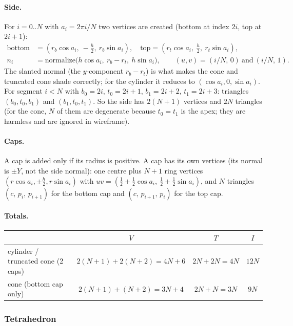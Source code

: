 \documentclass[a4paper, 11pt]{article}
\begin{document}
\paragraph{Side.} For $i=0..N$ with $a_i=2\pi i/N$ two vertices are created (bottom at index $2i$, top at $2i{+}1$):
\begin{align*}
  \text{bottom}&=(r_b\cos a_i,\ -\tfrac h2,\ r_b\sin a_i), \quad \text{top}=(r_t\cos a_i,\ \tfrac h2,\ r_t\sin a_i),\\
  n_i &= \mathrm{normalize}\bigl(h\cos a_i,\ r_b-r_t,\ h\sin a_i\bigr), \qquad (u,v)=(i/N,\,0)\ \text{and}\ (i/N,\,1).
\end{align*}
The slanted normal (the $y$-component $r_b-r_t$) is what makes the cone and truncated cone shade correctly; for the cylinder
it reduces to $(\cos a_i,0,\sin a_i)$. For segment $i<N$ with $b_0=2i$, $t_0=2i+1$, $b_1=2i+2$, $t_1=2i+3$:
triangles $(b_0,t_0,b_1)$ and $(b_1,t_0,t_1)$. So the side has $2(N+1)$ vertices and $2N$ triangles
(for the cone, $N$ of them are degenerate because $t_0=t_1$ is the apex; they are harmless and are ignored in wireframe).

\paragraph{Caps.} A cap is added only if its radius is positive. A cap has its own vertices (its normal is $\pm Y$, not
the side normal): one centre plus $N+1$ ring vertices $(r\cos a_i, \pm\tfrac h2, r\sin a_i)$ with $uv=(\tfrac12+\tfrac12\cos a_i,\ \tfrac12+\tfrac12\sin a_i)$,
and $N$ triangles $(c,\,p_i,\,p_{i+1})$ for the bottom cap and $(c,\,p_{i+1},\,p_i)$ for the top cap.

\paragraph{Totals.}
\begin{center}
\small
\begin{tabular}{@{}lccc@{}}
\toprule
 & $V$ & $T$ & $I$\\
\midrule
cylinder / truncated cone (2 caps) & $2(N{+}1)+2(N{+}2)=4N+6$ & $2N+2N=4N$ & $12N$\\
cone (bottom cap only)             & $2(N{+}1)+(N{+}2)=3N+4$  & $2N+N=3N$  & $9N$\\
\bottomrule
\end{tabular}
\end{center}

\subsubsection{Tetrahedron}
\end{document}
